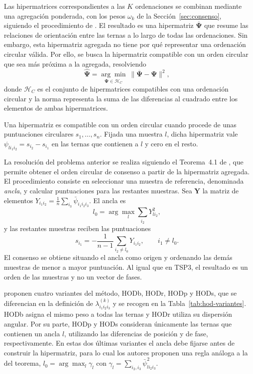 \documentclass[12pt, a4paper]{report}
\begin{document}
Las hipermatrices correspondientes a las \(K\) ordenaciones se combinan mediante una agregación ponderada, con los pesos \(\omega_k\) de la Sección~\ref{sec:consenso}, siguiendo el procedimiento de \citet{barragan2015}. El resultado es una hipermatriz \(\overline{\boldsymbol{\Psi}}\) que resume las relaciones de orientación entre las ternas a lo largo de todas las ordenaciones. Sin embargo, esta hipermatriz agregada no tiene por qué representar una ordenación circular válida. Por ello, se busca la hipermatriz compatible con un orden circular que sea más próxima a la agregada, resolviendo
\[
\widehat{\boldsymbol{\Psi}}=\underset{\boldsymbol{\Psi}\in\mathcal{H}_C}{\arg\min}\ \bigl\|\overline{\boldsymbol{\Psi}}-\boldsymbol{\Psi}\bigr\|^2 ,
\]
donde \(\mathcal{H}_C\) es el conjunto de hipermatrices compatibles con una ordenación circular y la norma representa la suma de las diferencias al cuadrado entre los elementos de ambas hipermatrices.

Una hipermatriz es compatible con un orden circular cuando procede de unas puntuaciones circulares \(s_1,\ldots,s_n\). Fijada una muestra \(l\), dicha hipermatriz vale \(\psi_{li_1i_2}=s_{i_2}-s_{i_1}\) en las ternas que contienen a \(l\) y cero en el resto.

La resolución del problema anterior se realiza siguiendo el Teorema~4.1 de \citet{barragan2015}, que permite obtener el orden circular de consenso a partir de la hipermatriz agregada. El procedimiento consiste en seleccionar una muestra de referencia, denominada \emph{ancla}, y calcular puntuaciones para las restantes muestras. Sea \(\mathbf{Y}\) la matriz de elementos \(Y_{i_1i_2}=\frac{1}{n}\sum_{i_3}\bar\psi_{i_1i_2i_3}\). El ancla es
\[
l_0=\arg\max_{l}\sum_{i_2}Y_{li_2}^{2},
\]
y las restantes muestras reciben las puntuaciones
\[
s_{i_1}=-\frac{1}{n-1}\sum_{i_2\neq l_0}Y_{i_1i_2},\qquad i_1\neq l_0 .
\]
El consenso se obtiene situando el ancla como origen y ordenando las demás muestras de menor a mayor puntuación. Al igual que en TSP3, el resultado es un orden de las muestras y no un vector de fases.

\citet{barragan2015} proponen cuatro variantes del método, HODb, HODr, HODp y HODs, que se diferencian en la definición de \(\lambda^{(k)}_{i_1i_2i_3}\) y se recogen en la Tabla~\ref{tab:hod-variantes}. HODb asigna el mismo peso a todas las ternas y HODr utiliza su dispersión angular. Por su parte, HODp y HODs consideran únicamente las ternas que contienen un ancla \(l\), utilizando las diferencias de posición y de fase, respectivamente. En estas dos últimas variantes el ancla debe fijarse antes de construir la hipermatriz, para lo cual los autores proponen una regla análoga a la del teorema, \(l_0=\arg\max_l\gamma_l\) con \(\gamma_l=\sum_{i_2,i_3}\bar\psi_{li_2i_3}^{2}\).
\end{document}
